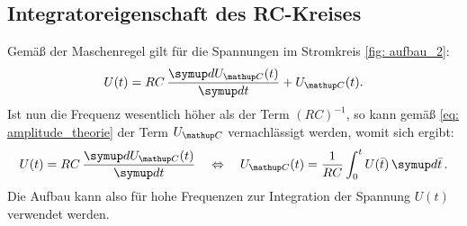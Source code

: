 \subsection{Integratoreigenschaft des RC-Kreises}
Gemäß der Maschenregel gilt für die Spannungen im Stromkreis \ref{fig: aufbau_2}:
\begin{equation}
  U(t) = RC\,\frac{\dif{U\ua{C}(t)}}{\dif{t}} + U\ua{C}(t). %
\end{equation}
Ist nun die Frequenz wesentlich höher als der Term $(RC)^{-1}$, so kann gemäß \eqref{eq: amplitude_theorie} der Term $U\ua{C}$ vernachlässigt werden, womit
sich ergibt:
\begin{equation}
  U(t) = RC\,\frac{\dif{U\ua{C}(t)}}{\dif{t}} \quad \Leftrightarrow \quad U\ua{C}(t) = \frac{1}{RC}\int_0^t U(\bar{t})\dif{\bar{t}}. %
\end{equation}
Die Aufbau kann also für hohe Frequenzen zur Integration der Spannung $U(t)$ verwendet werden.
